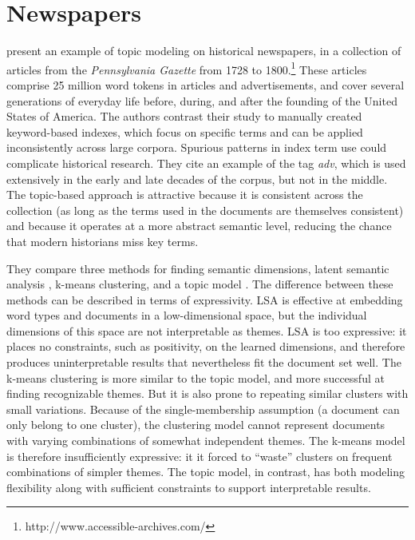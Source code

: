 
\section{Newspapers}

\cite{newman-06} present an example of topic modeling on historical newspapers, in a collection of articles from the {\em Pennsylvania Gazette} from 1728 to 1800.\footnote{http://www.accessible-archives.com/}
These articles comprise 25 million word tokens in articles and advertisements, and cover several generations of everyday life before, during, and after the founding of the United States of America.
The authors contrast their study to manually created keyword-based indexes, which focus on specific terms and can be applied inconsistently across large corpora.
Spurious patterns in index term use could complicate historical research.
They cite an example of the tag {\em adv}, which is used extensively in the early and late decades of the corpus, but not in the middle.
The topic-based approach is attractive because it is consistent across the collection (as long as the terms used in the documents are themselves consistent) and because it operates at a more abstract semantic level, reducing the chance that modern historians miss key terms.

They compare three methods for finding semantic dimensions, latent semantic analysis \citep{deerwester-90}, k-means clustering, and a topic model \citep{hofmann-99}.
The difference between these methods can be described in terms of expressivity.
LSA is effective at embedding word types and documents in a low-dimensional space, but the individual dimensions of this space are not interpretable as themes.
LSA is too expressive: it places no constraints, such as positivity, on the learned dimensions, and therefore produces uninterpretable results that nevertheless fit the document set well.
The k-means clustering is more similar to the topic model, and more successful at finding recognizable themes.
But it is also prone to repeating similar clusters with small variations.
Because of the single-membership assumption (a document can only belong to one cluster), the clustering model cannot represent documents with varying combinations of somewhat independent themes.
The k-means model is therefore insufficiently expressive: it it forced to ``waste'' clusters on frequent combinations of simpler themes.
The topic model, in contrast, has both modeling flexibility along with sufficient  constraints to support interpretable results.


